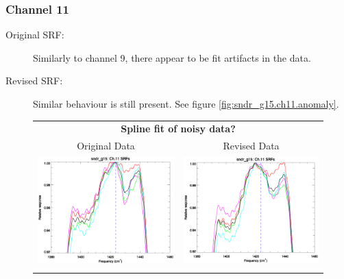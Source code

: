 \subsubsection{Channel 11}
\begin{description}
  \item[Original SRF:] Similarly to channel 9, there appear to be fit artifacts in the data.
  \item[Revised SRF:]  Similar behaviour is still present. See figure \ref{fig:sndr_g15.ch11.anomaly}.
\end{description}

\begin{figure}[htp]
  \centering
  \begin{tabular}{c c}
    \multicolumn{2}{c}{\textsf{\bfseries Spline fit of noisy data?}} \\
    \hspace{1.5em}\textsf{Original Data} &
    \hspace{1.5em}\textsf{Revised Data} \\
    \includegraphics[scale=0.5,trim=0 40 0 0]{graphics/zoom_anomaly/original/sndr_g15.ch11.srf.eps} &
    \includegraphics[scale=0.5,trim=0 40 0 0]{graphics/zoom_anomaly/revised/sndr_g15.ch11.srf.eps} \\\\

\end{tabular}
\end{figure}
